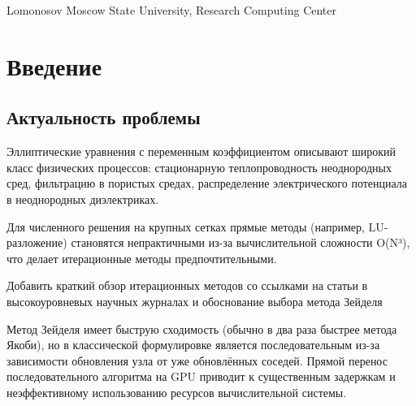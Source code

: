 \documentclass[10pt,a4paper]{book}
\begin{document}


{Lomonosov Moscow State University, Research Computing Center}


\MakeArticleHeader

\pagebreak

\section{Введение}

\subsection{Актуальность проблемы}

Эллиптические уравнения с переменным коэффициентом описывают широкий класс физических процессов: стационарную теплопроводность неоднородных сред, фильтрацию в пористых средах, распределение электрического потенциала в неоднородных диэлектриках.

Для численного решения на крупных сетках прямые методы (например, LU-разложение) становятся непрактичными из-за вычислительной сложности O(N³), что делает итерационные методы предпочтительными.

Добавить краткий обзор итерационных методов со ссылками на статьи в высокоуровневых научных журналах и обоснование выбора метода Зейделя

Метод Зейделя имеет быструю сходимость (обычно в два раза быстрее метода Якоби), но в классической формулировке является последовательным из-за зависимости обновления узла от уже обновлённых соседей. Прямой перенос последовательного алгоритма на GPU приводит к существенным задержкам и неэффективному использованию ресурсов вычислительной системы.
\end{document}
